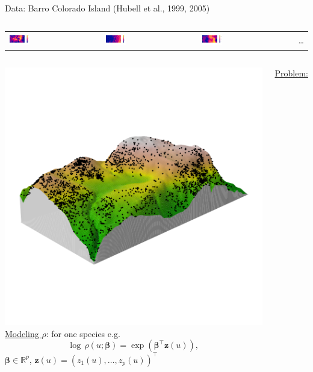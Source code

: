 \documentclass[serif]{beamer}
\newcommand{\tr}[1]{
	{\color{red}{ #1}}
}
\newcommand{\bz}{\mathbf{z}}
\newcommand{\bbeta}{\boldsymbol{\beta}}
\newcommand{\R}{\mathbb R}
\begin{document}
\begin{frame}{Data: Barro Colorado Island (Hubell et al., 1999, 2005)}
\begin{columns}
\begin{tabular}{llll}
				\includegraphics[width=0.23\textwidth]{covar11sim3.jpg} &  \includegraphics[width=0.23\textwidth]{covar12sim3.jpg} & \includegraphics[width=0.23\textwidth]{covar13sim3.jpg} &\dots
			\end{tabular}
\end{columns}

\bigskip

\hrulefill

\begin{columns}

\column{5cm}
\includegraphics[scale=.3]{bei3d}
\column{7cm}
\underline{Modeling $\rho$}: for one species e.g. 
\[
\log \, \rho(u;\bbeta) = \exp(\bbeta^\top \bz(u)),	
\] 
$\bbeta\in \R^p$, $\bz(u) =(z_1(u),\dots,z_p(u))^\top$

\underline{Problem:} \tr{$p$ large, covariates very correlated.	}
\end{columns}

\end{frame}
\end{document}
